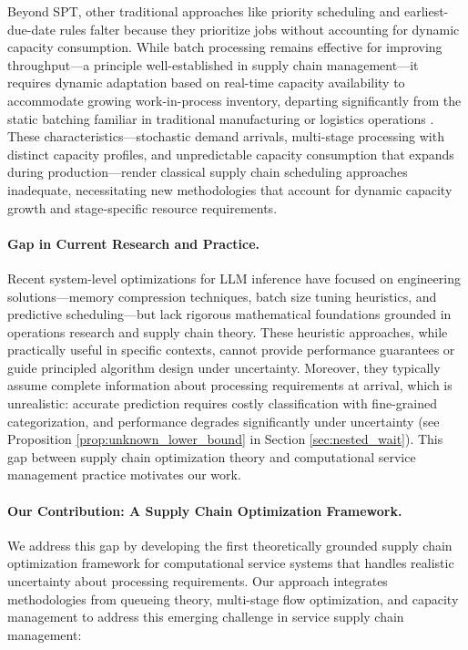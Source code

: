 \documentclass[poms,final,blindrev]{poms1_V1} %
\begin{document}
Beyond SPT, other traditional approaches like priority scheduling and earliest-due-date rules falter because they prioritize jobs without accounting for dynamic capacity consumption. While batch processing remains effective for improving throughput—a principle well-established in supply chain management—it requires dynamic adaptation based on real-time capacity availability to accommodate growing work-in-process inventory, departing significantly from the static batching familiar in traditional manufacturing or logistics operations \citep{patel2024splitwise, zhong2024distserve}. These characteristics—stochastic demand arrivals, multi-stage processing with distinct capacity profiles, and unpredictable capacity consumption that expands during production—render classical supply chain scheduling approaches inadequate, necessitating new methodologies that account for dynamic capacity growth and stage-specific resource requirements.

\paragraph{Gap in Current Research and Practice.}
Recent system-level optimizations for LLM inference \citep{yu2022orca, kwon2023efficient, agrawal2023sarathi, pope2023efficiently, deepseekai2024deepseekv2strongeconomicalefficient, patel2024splitwise, zhong2024distserve} have focused on engineering solutions—memory compression techniques, batch size tuning heuristics, and predictive scheduling—but lack rigorous mathematical foundations grounded in operations research and supply chain theory. These heuristic approaches, while practically useful in specific contexts, cannot provide performance guarantees or guide principled algorithm design under uncertainty. Moreover, they typically assume complete information about processing requirements at arrival, which is unrealistic: accurate prediction requires costly classification with fine-grained categorization, and performance degrades significantly under uncertainty (see Proposition \ref{prop:unknown_lower_bound} in Section \ref{sec:nested_wait}). This gap between supply chain optimization theory and computational service management practice motivates our work.

\paragraph{Our Contribution: A Supply Chain Optimization Framework.}
We address this gap by developing the first theoretically grounded supply chain optimization framework for computational service systems that handles realistic uncertainty about processing requirements. Our approach integrates methodologies from queueing theory, multi-stage flow optimization, and capacity management to address this emerging challenge in service supply chain management:
\end{document}
